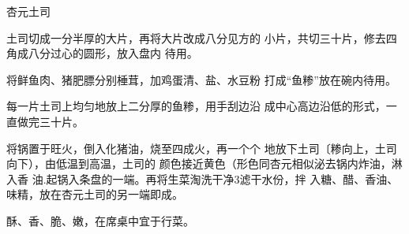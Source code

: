 \begin{recipe}{杏元土司}

\ingredients


\cooking

\step 	土司切成一分半厚的大片，再将大片改成八分见方的 小片，共切三十片，修去四角成八分过心的圆形，放入盘内 待用。

\step 将鲜鱼肉、猪肥膘分别棰茸，加鸡蛋清、盐、水豆粉 打成“鱼糁”放在碗内待用。

\step 	每一片土司上均匀地放上二分厚的鱼糁，用手刮边沿 成中心高边沿低的形式，一直做完三十片。

\step 	将锅置于旺火，倒入化猪油，烧至四成火，再一个个 地放下土司〔糁向上，土司向下），由低温到高温，土司的 颜色接近黄色（形色同杏元相似泌去锅内炸油，淋入香 油.起锅入条盘的一端。再将生菜淘洗干净3滤干水份，拌 入糖、醋、香油、味精，放在杏元土司的另一端即成。

\notes

酥、香、脆、嫩，在席桌中宜于行菜。

\end{recipe}


